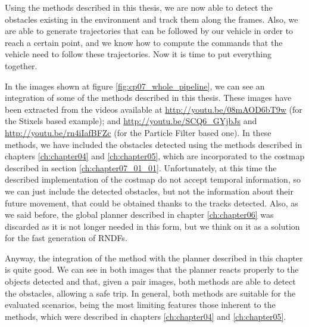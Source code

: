 
Using the methods described in this thesis, we are now able to detect the obstacles existing in the environment and track them along the frames. Also, we are able to generate trajectories that can be followed by our vehicle in order to reach a certain point, and we know how to compute the commands that the vehicle need to follow these trajectories. Now it is time to put everything together.

In the images shown at figure \ref{fig:cp07_whole_pipeline}, we can see an integration of some of the methods described in this thesis. These images have been extracted from the videos available at \url{http://youtu.be/08mAOD6bT9w} (for the Stixels based example); and \url{http://youtu.be/SCQ6_GYjbJs} and \url{http://youtu.be/rn4iIafBFZc} (for the Particle Filter based one). In these methods, we have included the obstacles detected using the methods described in chapters \ref{ch:chapter04} and \ref{ch:chapter05}, which are incorporated to the costmap described in section \ref{ch:chapter07_01_01}. Unfortunately, at this time the described implementation of the costmap do not accept temporal information, so we can just include the detected obstacles, but not the information about their future movement, that could be obtained thanks to the tracks detected. Also, as we said before, the global planner described in chapter \ref{ch:chapter06} was discarded as it is not longer needed in this form, but we think on it as a solution for the fast generation of \acp{RNDF}.


Anyway, the integration of the method with the planner described in this chapter is quite good. We can see in both images that the planner reacts properly to the objects detected and that, given a pair images, both methods are able to detect the obstacles, allowing a safe trip. In general, both methods are suitable for the evaluated scenarios, being the most limiting features those inherent to the methods, which were described in chapters \ref{ch:chapter04} and \ref{ch:chapter05}.

\FloatBarrier